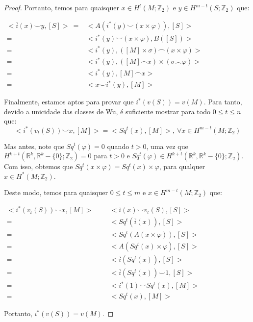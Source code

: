 \documentclass[12pt,oneside]{book} %
\newcommand{\R}{\mathbb{R}}
\newcommand{\Z}{\mathbb{Z}}
\newcommand{\ccup}{\smile}
\newcommand{\ccap}{\frown}
\begin{document}
\begin{proof}
	\par Portanto, temos para quaisquer $x\in H^{t}(M;\Z_{2})$ e $y\in H^{m-t}(S;\Z_{2})$ que: \newline
	
	$ \begin{array}{rl}
		<\overline{i}(x)\ccup y,[S]> \ = & <A(i^{*}(y)\ccup (x\times\varphi)),[S]> \\
		= & <i^{*}(y)\ccup (x\times\varphi),B([S])> \\
		= & <i^{*}(y),([M]\times\sigma)\ccap (x\times\varphi)> \\
		= & <i^{*}(y),([M]\ccap x)\times (\sigma\ccap\varphi)> \\
		= & <i^{*}(y),[M]\ccap x> \\
		= & <x\ccup i^{*}(y),[M]>
	\end{array} $ \newline
	
	\par Finalmente, estamos aptos para provar que $i^{*}(v(S))=v(M)$. Para tanto, devido a unicidade das classes de Wu, é suficiente mostrar para todo $0\leq t\leq n$ que:
	$$ <i^{*}(v_{t}(S))\ccup x,[M]>=<Sq^{t}(x),[M]>, \ \forall x\in H^{m-t}(M;\Z_{2}) $$
	
	\par Mas antes, note que $Sq^{t}(\varphi)=0$ quando $t>0$, uma vez que $H^{k+t}(\R^{k},\R^{k}-\{0\};\Z_{2})=0$ para $t>0$ e $Sq^{t}(\varphi)\in H^{k+t}(\R^{k},\R^{k}-\{0\};\Z_{2})$. Com isso, obtemos que $Sq^{t}(x\times \varphi)=Sq^{t}(x)\times\varphi$, para qualquer $x\in H^{*}(M;\Z_{2})$.
	
	\par Deste modo, temos para quaisquer $0\leq t\leq m$ e $x\in H^{m-t}(M;\Z_{2})$ que:\newline
	
	$ \begin{array}{rl}
		<i^{*}(v_{t}(S))\ccup x,[M]> \ = & <\overline{i}(x)\ccup v_{t}(S),[S]> \\
		= & <Sq^{t}(\overline{i}(x)),[S]> \\
		= & <Sq^{t}(A(x\times\varphi)),[S]> \\
		= & <A(Sq^{t}(x)\times\varphi),[S]> \\
		= & <\overline{i}(Sq^{t}(x)),[S]> \\
		= & <\overline{i}(Sq^{t}(x))\ccup 1,[S]> \\
		= & <i^{*}(1)\ccup Sq^{t}(x),[M]> \\
		= & <Sq^{t}(x),[M]>
	\end{array} $ \newline
	
	\par Portanto, $i^{*}(v(S))=v(M)$.
	
\end{proof}
\end{document}

